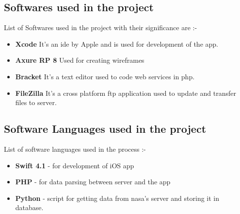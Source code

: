 \subsection{Softwares used in the project}

List of Softwares used in the project with their significance are :-

\begin{itemize}
    \item \textbf{Xcode}
    It's an \gls{ide} by Apple and is used for development of the app. \\
    
    \item \textbf{Axure RP 8}
    Used for creating wireframes \\
    
    \item \textbf{Bracket}
    It's a text editor used to code web services in \gls{php}. \\
    
    \item \textbf{FileZilla}
    It's a cross platform \gls{ftp} application used to update and transfer files to server. \\
    
\end{itemize}

\subsection{Software Languages used in the project}

List of software languages used in the process :-

\begin{itemize}
    \item \textbf{Swift 4.1} - for development of iOS app \\
    \item \textbf{PHP} - for data parsing between server and the app \\
    \item \textbf{Python} - script for getting data from \gls{nasa}'s server and storing it in database. \\
\end{itemize}
